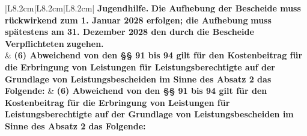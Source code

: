 \documentclass[10pt,a4paper,landscape]{article}
\begin{document}
\begin{longtable}{|L{8.2cm}|L{8.2cm}|L{8.2cm}|}
\textbf{\textcolor{diffgreen}{Jugendhilfe.}}\textbf{ Die Aufhebung der  \newline Bescheide muss rückwirkend zum 1.  \newline Januar 2028 erfolgen; die Aufhebung} \newline \textbf{\textcolor{diffgreen}{muss}}\textbf{ spätestens am 31. Dezember 2028  \newline den durch die Bescheide Verpflichteten} \newline \textbf{\textcolor{diffgreen}{zugehen.}} \\
\hhline{|---|}
 & \textbf{(6) Abweichend von den \S{}\S{} 91 bis 94 gilt  \newline für den Kostenbeitrag für die  \newline Erbringung von Leistungen für  \newline Leistungsberechtigte auf der Grundlage  \newline von Leistungsbescheiden im Sinne des  \newline Absatz 2 das Folgende: } & \textbf{(6) Abweichend von den \S{}\S{} 91 bis 94 gilt  \newline für den Kostenbeitrag für die  \newline Erbringung von Leistungen für  \newline Leistungsberechtigte auf der Grundlage  \newline von Leistungsbescheiden im Sinne des  \newline Absatz 2 das Folgende: } \\
\hhline{|---|}

\end{longtable}
\end{document}
